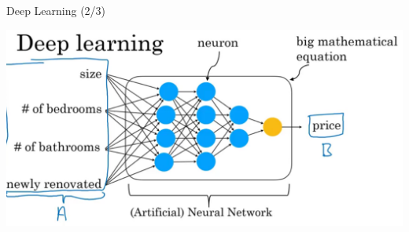 \documentclass[pdf]{beamer}
\theoremstyle{mystyle}
\begin{document}
\begin{frame}{Deep Learning (2/3)}
	\begin{center}
		\includegraphics[scale=.24]{deep-learning-2}
	\end{center}	
\end{frame}
\end{document}
